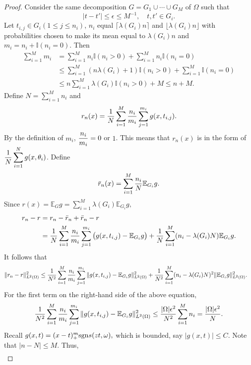 \begin{proof}
Consider the same decomposition $G=G_1\cup \cdots \cup G_M$ of $\Omega$ such that
$$
|t -t'| \leq \epsilon \le M^{-1},\quad t, t'\in G_i.
$$ 
Let  $t_{i,j} \in G_i(1\leq j\leq n_i)$,  $n_i$ equal $\lceil \lambda(G_i)n\rceil$ and $\lfloor \lambda(G_i)n\rfloor$ with probabilities chosen to make its mean equal to $\lambda(G_i)n$ and $m_i=n_i + \mathbb{I}(n_i=0)$. Then
\begin{align} 
\sum_{i=1}^M m_i&=\sum_{i=1}^M n_i\mathbb{I}(n_i>0) + \sum_{i=1}^M n_i\mathbb{I}(n_i=0)
\\
&\le \sum_{i=1}^M (n\lambda(G_i) + 1)\mathbb{I}(n_i>0) + \sum_{i=1}^M \mathbb{I}(n_i=0)
\\
&\le  n\sum_{i=1}^M \lambda(G_i)\mathbb{I}(n_i>0) + M
\le n+M.
\end{align} 
Define $\displaystyle N=\sum_{i=1}^Mn_i$  and
$$
r_{n}(x)= {1\over N}\sum_{i=1}^M {n_i\over m_i} \sum_{j=1}^{m_i} g(x, t_{i,j}).
$$
By the definition of $m_i$, $\displaystyle {n_i\over m_i}=0$ or $1$.  This means that $r_{n}(x) $ is in the form of  $\displaystyle {1\over N}\sum_{i=1}^Ng(x,\theta_i)$.  Define
$$
\bar{r}_{n}(x)= \sum_{i=1}^M {n_i\over N}\mathbb{E}_{G_i}g.
$$
Since
$
\displaystyle r(x)=\mathbb{E}_G g= \sum_{i=1}^M \lambda(G_i) \mathbb{E}_{G_i}g,
$  
\begin{align}  
r_{n} - r  &= r_{n} - \bar{r}_{n} + \bar{r}_{n} - r
\\
&= {1\over N}\sum_{i=1}^M {n_i\over m_i} \sum_{j=1}^{m_i} \big (g(x,t_{i,j}) - \mathbb{E}_{G_i}g \big ) + {1\over N}\sum_{i=1}^M (n_i - \lambda(G_i)N)  \mathbb{E}_{G_i}g.
\end{align}  
It follows that  
\begin{align}  
\|r_{n} - r \|_{L^2(\Omega)}^2 &
\le {1\over N^2}\sum_{i=1}^M {n_i\over m_i} \sum_{j=1}^{m_i} \|g(x,t_{i,j}) - \mathbb{E}_{G_i}g \|_{L^2(\Omega)}^2 
+  {1\over N^2}\sum_{i=1}^M (n_i - \lambda(G_i)N)^2  \|\mathbb{E}_{G_i}g\|_{L^2(\Omega)}^2.
\end{align} 
For the first term on the right-hand side of the above equation,
\begin{align}  
{1\over N^2}\sum_{i=1}^M {n_i\over m_i} \sum_{j=1}^{m_i} \|g(x,t_{i,j}) - \mathbb{E}_{G_i}g \|_{L^2(\Omega)}^2 
\le {|\Omega|\epsilon^2\over N^2}\sum_{i=1}^M n_i ={|\Omega|\epsilon^2\over N}.
\end{align} 
Recall 
$
g(x, t)= (x - t)_+^m {\rm sgn} s(zt,\omega),
$
which is bounded, say $|g(x, t)|\le C$. Note that $|n-N|\le M$. Thus,
\begin{align}

\end{align}
\end{proof}
